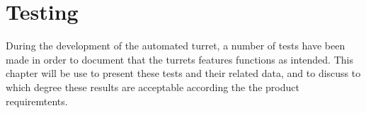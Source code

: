 \chapter{Testing}\label{AppendixTesting}
During the development of the automated turret, a number of tests have been made
in order to document that the turrets features functions as intended. This
chapter will be use to present these tests and their related data, and to
discuss to which degree these results are acceptable according the the product
requiremtents.




